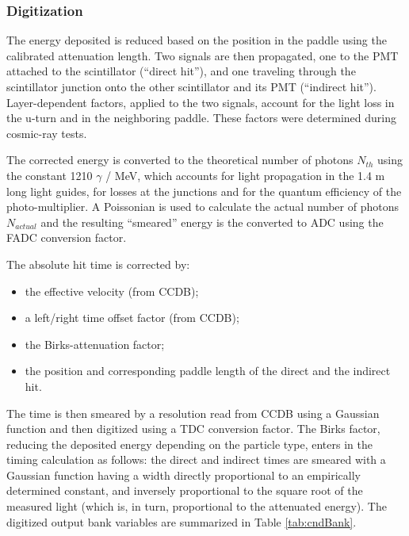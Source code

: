 \subsubsection{Digitization}

The energy deposited is reduced based on the position in the paddle using the calibrated attenuation length.
Two signals are then propagated, one to the PMT attached to the scintillator (``direct hit''), and one traveling through the scintillator junction
onto the other scintillator and its PMT (``indirect hit'').
Layer-dependent factors, applied to the two  signals, account for the light loss in the u-turn and in the neighboring paddle.
These factors were determined during cosmic-ray tests.

The corrected energy is converted to the theoretical number of photons $N_{th}$ using the constant 1210 $\gamma$ / MeV, which accounts for light
propagation in the 1.4 m long light guides, for losses at the junctions and for the quantum efficiency of the photo-multiplier.
A Poissonian is used to
calculate the actual number of photons $N_{actual}$ and the resulting ``smeared'' energy is the converted to ADC using the FADC conversion factor.

The absolute hit time is corrected by:

\begin{itemize}
	\item the effective velocity (from CCDB);
	\item a left/right time offset factor (from CCDB);
	\item the Birks-attenuation factor;
	\item the position and corresponding paddle length of the direct and the indirect hit.
\end{itemize}

The time is then smeared by a resolution read from CCDB using a Gaussian function and then digitized using a TDC conversion factor.
The Birks factor, reducing the deposited
energy depending on the particle type, enters in the timing calculation as
follows: the direct and indirect times are smeared with a Gaussian
function having a width directly proportional to an empirically determined
constant, and inversely proportional to the square root of the measured
light (which is, in turn, proportional to the attenuated energy).
The digitized output bank variables are summarized in Table \ref{tab:cndBank}.

